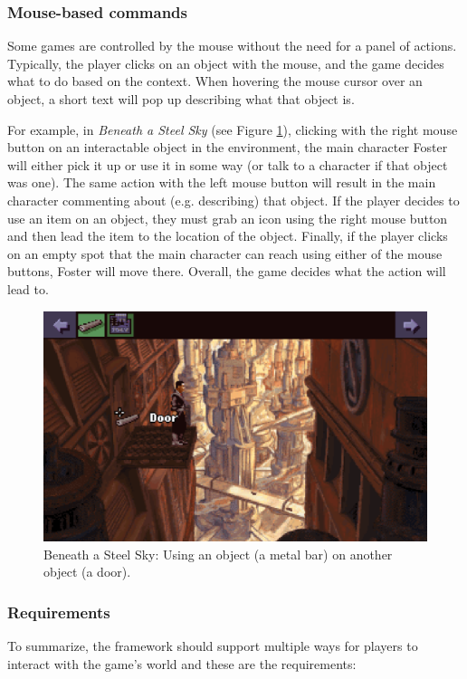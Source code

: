 \subsubsection{Mouse-based commands}
Some games are controlled by the mouse without the need for a panel of actions. Typically, the player clicks on an object with the mouse, and the game decides what to do based on the context. When hovering the mouse cursor over an object, a short text will pop up describing what that object is.

For example, in \textit{Beneath a Steel Sky} (see Figure \ref{fig:C-BaSS}), clicking with the right mouse button on an interactable object in the environment, the main character Foster will either pick it up or use it in some way (or talk to a character if that object was one). The same action with the left mouse button will result in the main character commenting about (e.g. describing) that object. If the player decides to use an item on an object, they must grab an icon using the right mouse button and then lead the item to the location of the object. Finally, if the player clicks on an empty spot that the main character can reach using either of the mouse buttons, Foster will move there. Overall, the game decides what the action will lead to.

\begin{figure}[H]
\centering
\includegraphics[width=.8\linewidth]{img/C-BaSS.png}
\caption{Beneath a Steel Sky: Using an object (a metal bar) on another object (a door).}
\label{fig:C-BaSS}
\end{figure}

\subsubsection{Requirements}
To summarize, the framework should support multiple ways for players to interact with the game's world and these are the requirements:

